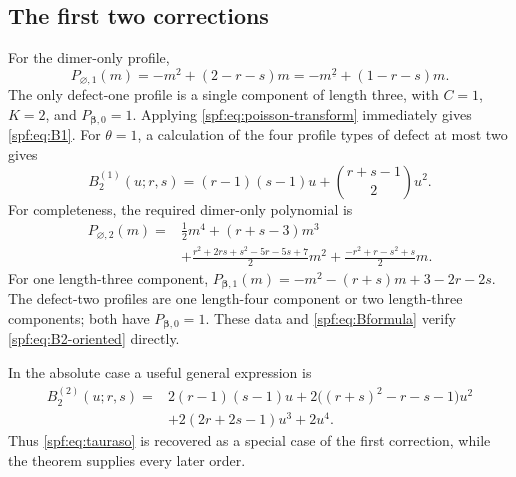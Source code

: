 \documentclass[11pt]{article}
\numberwithin{equation}{section}
\theoremstyle{definition}
\theoremstyle{remark}
\theoremstyle{definition}
\newcommand{\fall}[2]{{#1}^{\underline{#2}}}
\begin{document}
\subsection{The first two corrections}

For the dimer-only profile,
\begin{equation}
 P_{\varnothing,1}(m)=-m^2+(2-r-s)m
 =-\fall m2+(1-r-s)m.
\end{equation}
The only defect-one profile is a single component of length three, with
$C=1$, $K=2$, and $P_{\boldsymbol\beta,0}=1$. Applying
\eqref{spf:eq:poisson-transform} immediately gives \eqref{spf:eq:B1}. For $\theta=1$,
a calculation of the four profile types of defect at most two gives
\begin{equation}
 B_2^{(1)}(u;r,s)
 =(r-1)(s-1)u+\binom{r+s-1}{2}u^2.
 \label{spf:eq:B2-oriented}
\end{equation}
For completeness, the required dimer-only polynomial is
\begin{equation}
 \begin{split}
 P_{\varnothing,2}(m)
 ={}&\frac12m^4+(r+s-3)m^3\\
 &+\frac{r^2+2rs+s^2-5r-5s+7}{2}m^2
   +\frac{-r^2+r-s^2+s}{2}m.
 \end{split}
\end{equation}
For one length-three component,
$P_{\boldsymbol\beta,1}(m)=-m^2-(r+s)m+3-2r-2s$.
The defect-two profiles are one length-four component or two length-three
components; both have $P_{\boldsymbol\beta,0}=1$. These data and
\eqref{spf:eq:Bformula} verify \eqref{spf:eq:B2-oriented} directly.

In the absolute case a useful general expression is
\begin{equation}
 \begin{split}
 B_2^{(2)}(u;r,s)={}&2(r-1)(s-1)u
 +2\bigl((r+s)^2-r-s-1\bigr)u^2\\
 &+2(2r+2s-1)u^3+2u^4.
 \label{spf:eq:B2-absolute}
 \end{split}
\end{equation}
Thus \eqref{spf:eq:tauraso} is recovered as a special case of the first correction,
while the theorem supplies every later order.
\end{document}

